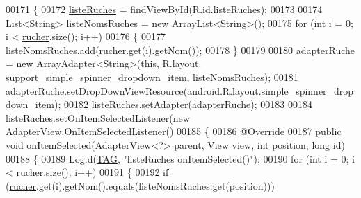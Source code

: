 \begin{DoxyCode}
00171     \{
00172         \hyperlink{classcom_1_1example_1_1bee__honeyt_1_1_i_h_m_mobile_a7275bce8e0026b1043371e6878ff65c1}{listeRuches} = findViewById(R.id.listeRuches);
00173 
00174         List<String> listeNomsRuches = \textcolor{keyword}{new} ArrayList<String>();
00175         \textcolor{keywordflow}{for} (\textcolor{keywordtype}{int} i = 0; i < \hyperlink{classcom_1_1example_1_1bee__honeyt_1_1_i_h_m_mobile_a80b422d45e9b5c91f7bcad1dca4ad292}{rucher}.size(); i++)
00176         \{
00177             listeNomsRuches.add(\hyperlink{classcom_1_1example_1_1bee__honeyt_1_1_i_h_m_mobile_a80b422d45e9b5c91f7bcad1dca4ad292}{rucher}.get(i).getNom());
00178         \}
00179 
00180         \hyperlink{classcom_1_1example_1_1bee__honeyt_1_1_i_h_m_mobile_afafe74da6dfeae76058bfbf17d4d23b3}{adapterRuche} = \textcolor{keyword}{new} ArrayAdapter<String>(\textcolor{keyword}{this}, R.layout.
      support\_simple\_spinner\_dropdown\_item, listeNomsRuches);
00181         \hyperlink{classcom_1_1example_1_1bee__honeyt_1_1_i_h_m_mobile_afafe74da6dfeae76058bfbf17d4d23b3}{adapterRuche}.setDropDownViewResource(android.R.layout.simple\_spinner\_dropdown\_item);
00182         \hyperlink{classcom_1_1example_1_1bee__honeyt_1_1_i_h_m_mobile_a7275bce8e0026b1043371e6878ff65c1}{listeRuches}.setAdapter(\hyperlink{classcom_1_1example_1_1bee__honeyt_1_1_i_h_m_mobile_afafe74da6dfeae76058bfbf17d4d23b3}{adapterRuche});
00183 
00184         \hyperlink{classcom_1_1example_1_1bee__honeyt_1_1_i_h_m_mobile_a7275bce8e0026b1043371e6878ff65c1}{listeRuches}.setOnItemSelectedListener(\textcolor{keyword}{new} AdapterView.OnItemSelectedListener()
00185         \{
00186             @Override
00187             \textcolor{keyword}{public} \textcolor{keywordtype}{void} onItemSelected(AdapterView<?> parent, View view, \textcolor{keywordtype}{int} position, \textcolor{keywordtype}{long} \textcolor{keywordtype}{id})
00188             \{
00189                 Log.d(\hyperlink{classcom_1_1example_1_1bee__honeyt_1_1_i_h_m_mobile_a366987bf9bb2ed1010b2f967d4efa263}{TAG}, \textcolor{stringliteral}{"listeRuches onItemSelected()"});
00190                 \textcolor{keywordflow}{for} (\textcolor{keywordtype}{int} i = 0; i < \hyperlink{classcom_1_1example_1_1bee__honeyt_1_1_i_h_m_mobile_a80b422d45e9b5c91f7bcad1dca4ad292}{rucher}.size(); i++)
00191                 \{
00192                     \textcolor{keywordflow}{if} (\hyperlink{classcom_1_1example_1_1bee__honeyt_1_1_i_h_m_mobile_a80b422d45e9b5c91f7bcad1dca4ad292}{rucher}.get(i).getNom().equals(listeNomsRuches.get(position)))

\end{DoxyCode}
